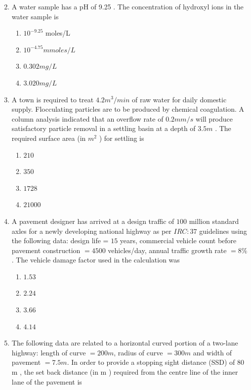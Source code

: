 \documentclass[journal]{IEEEtran}
\begin{document}
\begin{enumerate}
\begin{enumerate}
\begin{multicols}{4}
                    \end{multicols}   
	       \end{enumerate}	
       \item A water sample has a pH of 9.25 . The concentration of hydroxyl ions in the water sample is
		\begin{enumerate}
			\item $10^{-9.25}$ moles/L
			\item $10^{-4.75} mmoles/L$
			\item $0.302mg/L$
			\item $3.020mg/L$
		\end{enumerate}
	\item  A town is required to treat $4.2 m^{3} / min$ of raw water for daily domestic supply. Flocculating particles are to be produced by chemical coagulation. A column analysis indicated that an overflow rate of $0.2 mm / s$ will produce satisfactory particle removal in a settling basin at a depth of $3.5 m$ . The required surface area (in $m^{2}$ ) for settling is
		\begin{enumerate}
			\item $210$
			\item $350$
			\item$1728$
	        \item $21000$
        	\end{enumerate}
	\item A pavement designer has arrived at a design traffic of $100$ million standard axles for a newly developing national highway as per $IRC:37$ guidelines using the following data: design life = $15$ years, commercial vehicle count before pavement construction $=4500$ vehicles/day, annual traffic growth rate $=8 \%$. The vehicle damage factor used in the calculation was
		\begin{enumerate}
		       \item $1.53$
		       \item $2.24$
		       \item $3.66$
		       \item $4.14$
        	\end{enumerate}	
	\item The following data are related to a horizontal curved portion of a two-lane highway: length of curve $=200 m$, radius of curve $=300 m$ and width of pavement $=7.5 m$. In order to provide a stopping sight distance (SSD) of $80$ m , the set back distance (in m ) required from the centre line of the inner lane of the pavement is
		\begin{enumerate}

\end{enumerate}
\end{enumerate}
\end{document}
